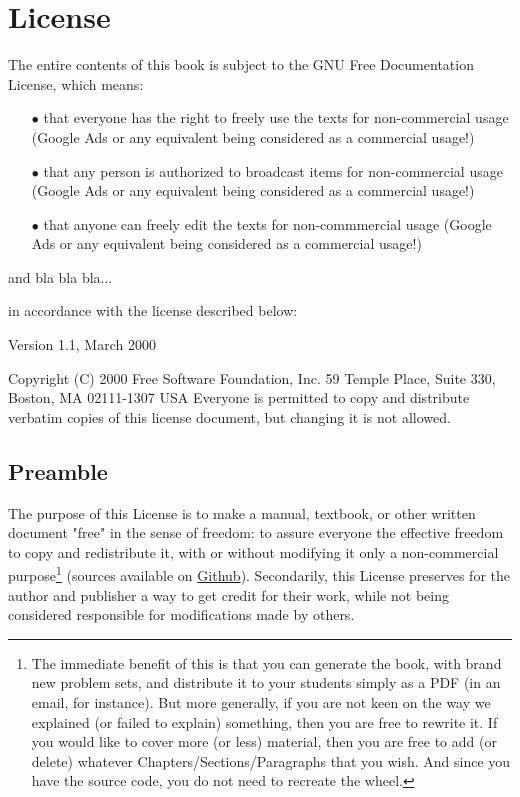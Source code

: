 	\newpage
	\thispagestyle{empty}
	\mbox{}
	\section{License}
	The entire contents of this book is subject to the GNU Free Documentation License, which means:
	\begin{itemize}
			\item[$\bullet$] that everyone has the right to freely use the texts for non-commercial usage (Google Ads or any equivalent being considered as a commercial usage!)
			\item[$\bullet$] that any person is authorized to broadcast items for non-commercial usage (Google Ads or any equivalent being considered as a commercial usage!)
			\item[$\bullet$] that anyone can freely edit the texts for non-commmercial usage (Google Ads or any equivalent being considered as a commercial usage!)
	\end{itemize}
	
	and bla bla bla...

	in accordance with the license described below: 

	\begin{center}
	Version 1.1, March 2000
		
	Copyright (C) 2000 Free Software Foundation, Inc. 59 Temple Place, Suite 330, Boston, MA 02111-1307 USA Everyone is permitted to copy and distribute verbatim copies of this license document, but changing it is not allowed. 
	\end{center}

	\subsection{Preamble} 

	The purpose of this License is to make a manual, textbook, or other written document "free" in the sense of freedom: to assure everyone the effective freedom to copy and redistribute it, with or without modifying it only a non-commercial purpose\footnote{The immediate benefit of this is that you can generate the book, with brand new  problem sets, and distribute it to your students simply as a PDF (in an email, for instance). But more generally, if you are not keen on the way we explained (or failed to explain) something, then you are free to rewrite it. If you would like to cover more (or less) material, then you are free to add (or delete) whatever Chapters/Sections/Paragraphs
that you wish. And since you have the source code, you do not need to recreate the wheel.} (sources available on \href{https://github.com/vincentisoz}{Github}). Secondarily, this License preserves for the author and publisher a way to get credit for their work, while not being considered responsible for modifications made by others.

